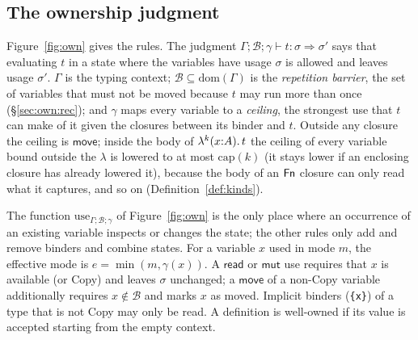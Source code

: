 \subsection{The ownership judgment}\label{sec:own:rules}

Figure~\ref{fig:own} gives the rules.
The judgment $\Gamma; \mathcal{B}; \gamma \vdash t : \sigma \Rightarrow \sigma'$ says that evaluating $t$ in a state where the variables have usage $\sigma$ is allowed and leaves usage $\sigma'$.
$\Gamma$ is the typing context; $\mathcal{B} \subseteq \mathrm{dom}(\Gamma)$ is the \emph{repetition barrier}, the set of variables that must not be moved because $t$ may run more than once (\S\ref{sec:own:rec}); and $\gamma$ maps every variable to a \emph{ceiling}, the strongest use that $t$ can make of it given the closures between its binder and $t$.
Outside any closure the ceiling is $\mathsf{move}$; inside the body of $\lambda^{k}(x{:}A).\,t$ the ceiling of every variable bound outside the $\lambda$ is lowered to at most $\mathrm{cap}(k)$ (it stays lower if an enclosing closure has already lowered it), because the body of an $\mathsf{Fn}$ closure can only read what it captures, and so on (Definition~\ref{def:kinds}).

The function $\mathrm{use}_{\Gamma;\mathcal{B};\gamma}$ of Figure~\ref{fig:own} is the only place where an occurrence of an existing variable inspects or changes the state; the other rules only add and remove binders and combine states.
For a variable $x$ used in mode $m$, the effective mode is $e = \min(m, \gamma(x))$.
A $\mathsf{read}$ or $\mathsf{mut}$ use requires that $x$ is available (or Copy) and leaves $\sigma$ unchanged; a $\mathsf{move}$ of a non-Copy variable additionally requires $x \notin \mathcal{B}$ and marks $x$ as moved.
Implicit binders (\lstinline|{x}|) of a type that is not Copy may only be read.
A definition is well-owned if its value is accepted starting from the empty context.

